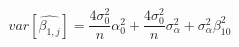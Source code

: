 \begin{equation}
var[\hat{\beta_{1,j}}] = \frac{4\sigma_0^2}{n}\alpha_0^2 + \frac{4\sigma_0^2}{n}\sigma_{\alpha}^2 + \sigma_{\alpha}^2\beta_{10}^2
\end{equation}